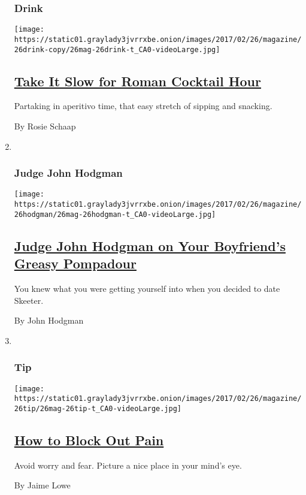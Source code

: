 \begin{enumerate}
{  \subsubsection{Drink}\label{drink}}

  \texttt{[image: https://static01.graylady3jvrrxbe.onion/images/2017/02/26/magazine/26drink-copy/26mag-26drink-t\_CA0-videoLarge.jpg]}

  \hypertarget{take-it-slow-for-roman-cocktail-hour}{%
  \subsection{\texorpdfstring{\href{/2017/02/24/magazine/take-it-slow-for-roman-cocktail-hour.html}{Take
  It Slow for Roman Cocktail
  Hour}}{Take It Slow for Roman Cocktail Hour}}\label{take-it-slow-for-roman-cocktail-hour}}

  Partaking in aperitivo time, that easy stretch of sipping and
  snacking.

  By Rosie Schaap
\item ~
  \hypertarget{judge-john-hodgman}{%
  \subsubsection{Judge John Hodgman}\label{judge-john-hodgman}}

  \texttt{[image: https://static01.graylady3jvrrxbe.onion/images/2017/02/26/magazine/26hodgman/26mag-26hodgman-t\_CA0-videoLarge.jpg]}

  \hypertarget{judge-john-hodgman-on-your-boyfriends-greasy-pompadour}{%
  \subsection{\texorpdfstring{\href{/2017/02/24/magazine/judge-john-hodgman-on-your-boyfriends-greasy-pompadour.html}{Judge
  John Hodgman on Your Boyfriend's Greasy
  Pompadour}}{Judge John Hodgman on Your Boyfriend's Greasy Pompadour}}\label{judge-john-hodgman-on-your-boyfriends-greasy-pompadour}}

  You knew what you were getting yourself into when you decided to date
  Skeeter.

  By John Hodgman
\item ~
  \hypertarget{tip}{%
  \subsubsection{Tip}\label{tip}}

  \texttt{[image: https://static01.graylady3jvrrxbe.onion/images/2017/02/26/magazine/26tip/26mag-26tip-t\_CA0-videoLarge.jpg]}

  \hypertarget{how-to-block-out-pain}{%
  \subsection{\texorpdfstring{\href{/2017/02/24/magazine/how-to-block-out-pain.html}{How
  to Block Out
  Pain}}{How to Block Out Pain}}\label{how-to-block-out-pain}}

  Avoid worry and fear. Picture a nice place in your mind's eye.

  By Jaime Lowe
\end{enumerate}

